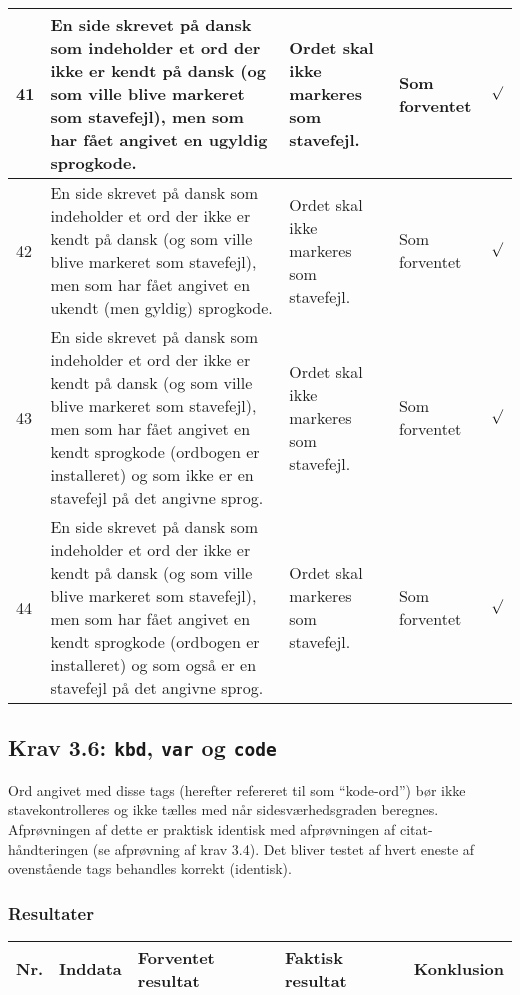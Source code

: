 \documentclass[a4paper,oneside,article]{memoir}
\begin{document}
\begin{landscape}
\begin{longtable}[c]{p{20pt}|p{220pt}|p{130pt}|p{130pt}|p{50pt}}
41 &
En side skrevet på dansk som indeholder et ord der ikke er kendt på
dansk (og som ville blive markeret som stavefejl), men som har fået
angivet en ugyldig sprogkode. &
Ordet skal ikke markeres som stavefejl. &
Som forventet &
$\surd$ \\ \hline

42 &
En side skrevet på dansk som indeholder et ord der ikke er kendt på
dansk (og som ville blive markeret som stavefejl), men som har fået
angivet en ukendt (men gyldig) sprogkode. &
Ordet skal ikke markeres som stavefejl. &
Som forventet &
$\surd$ \\ \hline

43 &
En side skrevet på dansk som indeholder et ord der ikke er kendt på
dansk (og som ville blive markeret som stavefejl), men som har fået
angivet en kendt sprogkode (ordbogen er installeret) og som ikke er en
stavefejl på det angivne sprog. &
Ordet skal ikke markeres som stavefejl. &
Som forventet &
$\surd$ \\ \hline

44 &
En side skrevet på dansk som indeholder et ord der ikke er kendt på
dansk (og som ville blive markeret som stavefejl), men som har fået
angivet en kendt sprogkode (ordbogen er installeret) og som også er en
stavefejl på det angivne sprog. &
Ordet skal markeres som stavefejl. &
Som forventet &
$\surd$ \\ \hline

\end{longtable}

\subsection{Krav 3.6: \texttt{kbd}, \texttt{var} og \texttt{code}}

Ord angivet med disse tags (herefter refereret til som ``kode-ord'')
bør ikke stavekontrolleres og ikke tælles med når sidesværhedsgraden
beregnes. Afprøvningen af dette er praktisk identisk med afprøvningen
af citat-håndteringen (se afprøvning af krav 3.4). Det bliver testet
af hvert eneste af ovenstående tags behandles korrekt (identisk).

\subsubsection{Resultater}
\begin{longtable}[c]{p{20pt}|p{220pt}|p{130pt}|p{130pt}|p{50pt}}
\textbf{Nr.} &
\textbf{Inddata} &
\textbf{Forventet resultat} &
\textbf{Faktisk resultat} &
\textbf{Konklusion} \\ \hline


\end{longtable}
\end{landscape}
\end{document}
